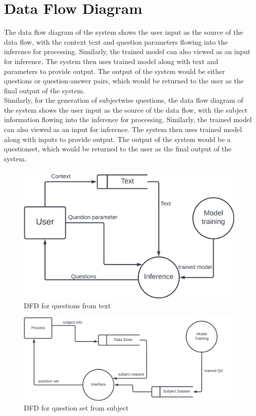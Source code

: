 \documentclass[12pt]{report}
\begin{document}
\section{Data Flow Diagram}
 The data flow diagram of the system shows the user input as the source of the data flow, with the context text and question parameters flowing into the inference for processing. Similarly, the trained model can also viewed as an input for inference. The system then uses trained model along with text and parameters to provide output. The output of the system would be either questions or question-answer pairs, which would be returned to the user as the final output of the system.
 \\
 Similarly, for the generation of subjectwise questions, the data flow diagram of the system shows the user input as the source of the data flow, with the subject information flowing into the inference for processing. Similarly, the trained model can also viewed as an input for inference. The system then uses trained model along with inputs to provide output. The output of the system would be a questionset, which would be returned to the user as the final output of the system.
\begin{figure}[ht!]
    \centering
    \includegraphics[scale = 0.7]{Images/DFD1.png}
    \caption{DFD for questions from text}
\end{figure}
 
\begin{figure}[ht!]
    \centering
    \includegraphics[scale = 0.7]{Images/DFD2.png}
    \caption{DFD for question set from subject}
\end{figure}
\pagebreak
\end{document}
